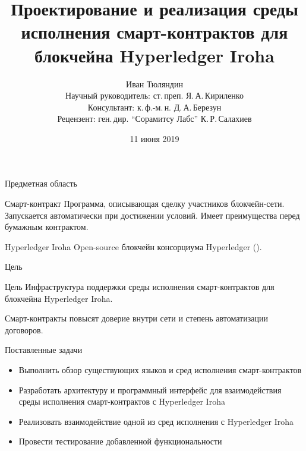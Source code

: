 \documentclass[hyperref={pdfpagelabels=false}]{beamer}
\begin{document}
  
\title[Смарт-контракты для Hyperledger Iroha]{Проектирование и реализация среды исполнения смарт-контрактов для блокчейна Hyperledger Iroha}  
\author[И. Тюляндин]{Иван Тюляндин\\%
Научный руководитель: ст.\,преп. Я.\,А.\,Кириленко\\%
Консультант: к.\,ф.-м.\,н. Д.\,А.\,Березун\\%
Рецензент: ген.\,дир. “Сорамитсу Лабс” К.\,Р.\,Салахиев%
} 
\date{11 июня 2019} 
{
}

\begin{frame}{Предметная область}
\begin{block}{Смарт-контракт} 
Программа, описывающая сделку участников блокчейн-сети. Запускается автоматически при достижении условий. 
Имеет преимущества перед бумажным контрактом.
\end{block}
\vfill
\begin{block}{Hyperledger Iroha}
Open-source блокчейн консорциума Hyperledger ({\color{blue}{https://github.com/hyperledger/iroha}}).
\end{block}
\end{frame} 

\begin{frame}{Цель}
\begin{block}{Цель}
Инфраструктура поддержки среды исполнения смарт-контрактов для блокчейна Hyperledger Iroha.
\end{block}
\vfill
Смарт-контракты повысят доверие внутри сети и степень автоматизации договоров.
\end{frame} 

\begin{frame}{Поставленные задачи}
\begin{itemize}
\item Выполнить обзор существующих языков и сред исполнения смарт-контрактов
\vfill
\item Разработать архитектуру и программный интерфейс для взаимодействия среды исполнения смарт-контрактов с Hyperledger Iroha
\vfill
\item Реализовать взаимодействие одной из сред исполнения с Hyperledger Iroha
\vfill
\item Провести тестирование добавленной функциональности
\end{itemize}

\end{frame} 
\end{document}

